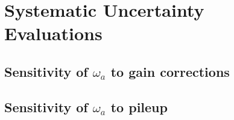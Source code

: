\graphicspath{ {Figures/Pileup/Multiplier/} }

\chapter{Systematic Uncertainty Evaluations}

\section{Sensitivity of \texorpdfstring{$\omega_{a}$}{} to gain corrections}

\section{Sensitivity of \texorpdfstring{$\omega_{a}$}{} to pileup}

